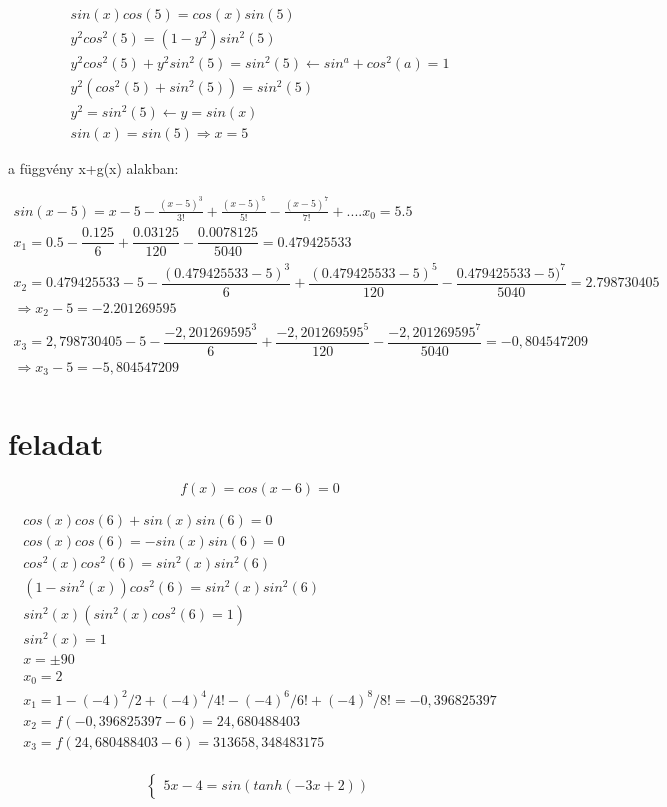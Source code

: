\documentclass{article}
\begin{document}
\begin{multline}
sin(x)cos(5)=cos(x)sin(5) \\
y^{2}cos^{2}(5) = (1-y^{2})sin^{2}(5)\\
y^{2}cos^{2}(5)+y^{2}sin^{2}(5) = sin^{2}(5) \leftarrow sin^{a}+cos^{2}(a) = 1 \\
y^{2}(cos^{2}(5)+sin^{2}(5)) = sin^{2}(5)\\
y^{2} = sin^{2}(5) \leftarrow y=sin(x) \\
sin(x)=sin(5) \Rightarrow x=5
\end{multline}

a függvény x+g(x) alakban:

\begin{multline}
sin(x-5)=x-5-\frac{(x-5)^{3}}{3!}+\frac{(x-5)^{5}}{5!} - \frac{(x-5)^{7}}{7!} + ....
x_{0} = 5.5\\
x_{1} = 0.5-\dfrac{0.125}{6}+\dfrac{0.03125}{120}-\dfrac{0.0078125}{5040} = 0.479425533\\
x_2 = 0.479425533-5 - \dfrac{(0.479425533-5)^3}{6} +\dfrac{(0.479425533-5)^5}{120} - \dfrac{0.479425533-5)^7}{5040} = 2.798730405\\
\Rightarrow x_2 - 5 = -2.201269595\\
x_3 = 2,798730405 - 5 - \dfrac{-2,201269595^3}{6}+\dfrac{-2,201269595^5}{120} - \dfrac{-2,201269595^7}{5040} =-0,804547209\\
\Rightarrow x_3 - 5 = -5,804547209\\
\end{multline}

\section{feladat}
\begin{equation}
f(x)= cos(x-6) =0
\end{equation}

\begin{multline}
cos(x)cos(6)+sin(x)sin(6) = 0\\
cos(x)cos(6)=-sin(x)sin(6) = 0\\
cos^{2}(x)cos^{2}(6)=sin^{2}(x)sin^{2}(6)\\
(1-sin^{2}(x))cos^{2}(6) = sin^{2}(x)sin^{2}(6)\\
sin^{2}(x)(sin^{2}(x)cos^{2}(6) = 1) \\
sin^{2}(x)= 1 \\
x = \pm 90\\
x_0 = 2 \\
x_1 = 1-(-4)^{2}/2 +(-4)^{4}/4! - (-4)^{6}/6! + (-4)^{8}/8! = -0,396825397\\
x_2 = f(-0,396825397-6)= 24,680488403\\
x_3 = f(24,680488403-6) = 313658,348483175\\
\end{multline}




\begin{equation}
   \begin{cases}
      5x-4 = sin(tanh(-3x+2))
    \end{cases}       
\end{equation}
 
\end{document}
